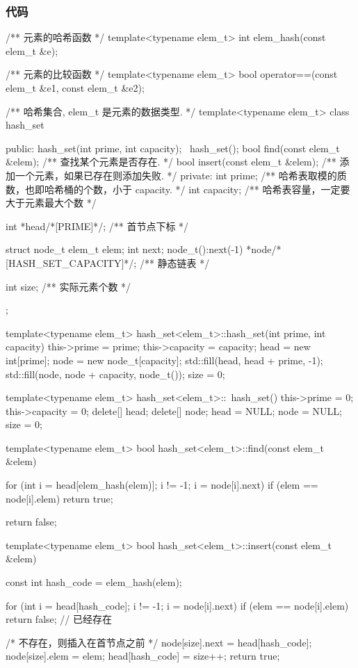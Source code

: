 \subsubsection{代码}
\begin{Codex}[label=hash_set.hpp]
/** 元素的哈希函数  */
template<typename elem_t>
int elem_hash(const elem_t &e);

/** 元素的比较函数  */
template<typename elem_t>
bool operator==(const elem_t &e1, const elem_t &e2);

/** 哈希集合, elem_t 是元素的数据类型. */
template<typename elem_t>
class hash_set {
public:
    hash_set(int prime, int capacity);
    ~hash_set();
    bool find(const elem_t &elem); /** 查找某个元素是否存在. */
    bool insert(const elem_t &elem); /** 添加一个元素，如果已存在则添加失败. */
private:
    int prime; /** 哈希表取模的质数，也即哈希桶的个数，小于 capacity. */
    int capacity; /** 哈希表容量，一定要大于元素最大个数  */

    int *head/*[PRIME]*/; /** 首节点下标 */

    struct node_t {
        elem_t elem;
        int next;
        node_t():next(-1) {}
    } *node/*[HASH_SET_CAPACITY]*/; /** 静态链表 */

    int size; /** 实际元素个数 */
};

template<typename elem_t>
hash_set<elem_t>::hash_set(int prime, int capacity) {
    this->prime = prime;
    this->capacity = capacity;
    head = new int[prime];
    node = new node_t[capacity];
    std::fill(head, head + prime, -1);
    std::fill(node, node + capacity, node_t());
    size = 0;
}

template<typename elem_t>
hash_set<elem_t>::~hash_set() {
    this->prime = 0;
    this->capacity = 0;
    delete[] head;
    delete[] node;
    head = NULL;
    node = NULL;
    size = 0;
}

template<typename elem_t>
bool hash_set<elem_t>::find(const elem_t &elem) {
    for (int i = head[elem_hash(elem)]; i != -1; i = node[i].next)
        if (elem == node[i].elem) return true;

    return false;
}

template<typename elem_t>
bool hash_set<elem_t>::insert(const elem_t &elem) {
    const int hash_code = elem_hash(elem);

    for (int i = head[hash_code]; i != -1; i = node[i].next)
        if (elem == node[i].elem) return false; // 已经存在

    /* 不存在，则插入在首节点之前 */
    node[size].next = head[hash_code];
    node[size].elem = elem;
    head[hash_code] = size++;
    return true;
}
\end{Codex}


